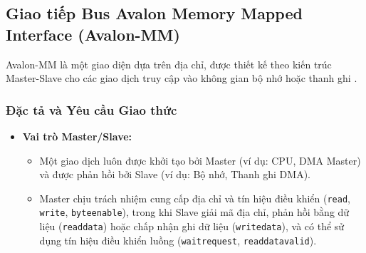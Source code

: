 \subsection{Giao tiếp Bus Avalon Memory Mapped Interface (Avalon-MM)}
Avalon-MM là một giao diện dựa trên địa chỉ, được thiết kế theo kiến trúc Master-Slave cho các giao dịch truy cập vào không gian bộ nhớ hoặc thanh ghi \cite{avalon_mm_transfer}.

\subsubsection{Đặc tả và Yêu cầu Giao thức}
\begin{itemize}
    \item \textbf{Vai trò Master/Slave:}
    \begin{itemize}
        \item Một giao dịch luôn được khởi tạo bởi Master (ví dụ: CPU, DMA Master) và được phản hồi bởi Slave (ví dụ: Bộ nhớ, Thanh ghi DMA).
        \item Master chịu trách nhiệm cung cấp địa chỉ và tín hiệu điều khiển (\texttt{read}, \texttt{write}, \texttt{byteenable}), trong khi Slave giải mã địa chỉ, phản hồi bằng dữ liệu (\texttt{readdata}) hoặc chấp nhận ghi dữ liệu (\texttt{writedata}), và có thể sử dụng tín hiệu điều khiển luồng (\texttt{waitrequest}, \texttt{readdatavalid}).
    \end{itemize} 


\end{itemize}
